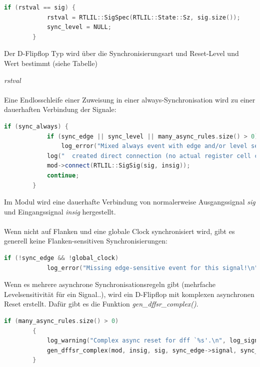 \documentclass[11pt]{report}
\begin{document}
\begin{enumerate}
\begin{lstlisting}[language=C++]
		if (rstval == sig) {
			rstval = RTLIL::SigSpec(RTLIL::State::Sz, sig.size());
			sync_level = NULL;
		}
\end{lstlisting}
Der D-Flipflop Typ wird über die Synchronisierungsart und Reset-Level und Wert bestimmt (siehe Tabelle)

\textit{rstval}\\
\\
Eine Endlosschleife einer Zuweisung in einer always-Synchronisation wird zu einer dauerhaften Verbindung der Signale:
\begin{lstlisting}[language=C++]
	if (sync_always) {
			if (sync_edge || sync_level || many_async_rules.size() > 0)
				log_error("Mixed always event with edge and/or level sensitive events!\n");
			log("  created direct connection (no actual register cell created).\n");
			mod->connect(RTLIL::SigSig(sig, insig));
			continue;
		}
\end{lstlisting}
Im Modul wird eine dauerhafte Verbindung von normalerweise Ausgangssignal \textit{sig} und Eingangssignal \textit{insig} hergestellt.\\
\\
Wenn nicht auf Flanken und eine globale Clock synchronisiert wird, gibt es generell keine Flanken-sensitiven Synchronisierungen:
\begin{lstlisting}[language=C++]
		if (!sync_edge && !global_clock)
			log_error("Missing edge-sensitive event for this signal!\n");
\end{lstlisting}
Wenn es mehrere asynchrone Synchronisationsregeln gibt (mehrfache Levelsensitivität für ein Signal..), wird ein D-Flipflop mit komplexen asynchronen Reset erstellt. Dafür gibt es die Funktion \textit{gen\_dffsr\_complex()}.
\begin{lstlisting}[language=C++]
		if (many_async_rules.size() > 0)
		{
			log_warning("Complex async reset for dff `%s'.\n", log_signal(sig));
			gen_dffsr_complex(mod, insig, sig, sync_edge->signal, sync_edge->type == RTLIL::SyncType::STp, many_async_rules, proc);
		}
\end{lstlisting}


\end{enumerate}
\end{document}
